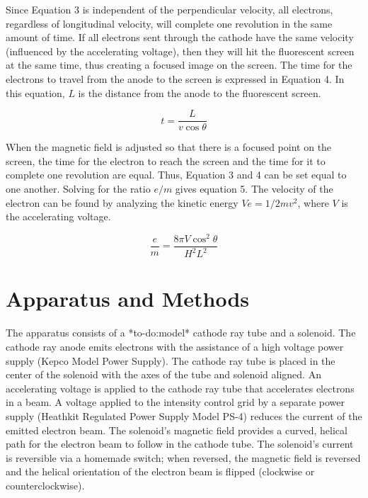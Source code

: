 \documentclass[%
 aip,
 amsmath,amssymb,
 reprint,%
floatfix,
]{revtex4-1}
\begin{document}
\noindent Since Equation 3 is independent of the perpendicular velocity, all electrons, regardless of longitudinal velocity, will complete one revolution in the same amount of time. If all electrons sent through the cathode have the same velocity (influenced by the accelerating voltage), then they will hit the fluorescent screen at the same time, thus creating a focused image on the screen. The time for the electrons to travel from the anode to the screen is expressed in Equation 4. In this equation, $L$ is the distance from the anode to the fluorescent screen.

\begin{equation}
	t = \frac{L}{v \cos{\theta}}
\end{equation}

\noindent When the magnetic field is adjusted so that there is a focused point on the screen, the time for the electron to reach the screen and the time for it to complete one revolution are equal. Thus, Equation 3 and 4 can be set equal to one another. Solving for the ratio $e/m$ gives equation 5. The velocity of the electron can be found by analyzing the kinetic energy $V e = 1/2 m v^2$, where $V$ is the accelerating voltage.

\begin{equation}
	\frac{e}{m} = \frac{8 \pi V \cos^2{\theta}}{H^2 L^2}
\end{equation}



\section{\label{sec:level3}Apparatus and Methods}

The apparatus consists of a *to-do:model* cathode ray tube and a solenoid. The cathode ray anode emits electrons with the assistance of a high voltage power supply (Kepco Model Power Supply). The cathode ray tube is placed in the center of the solenoid with the axes of the tube and solenoid aligned. An accelerating voltage is applied to the cathode ray tube that accelerates electrons in a beam. A voltage applied to the intensity control grid by a separate power supply (Heathkit Regulated Power Supply Model PS-4) reduces the current of the emitted electron beam. The solenoid's magnetic field provides a curved, helical path for the electron beam to follow in the cathode tube. The solenoid's current is reversible via a homemade switch; when reversed, the magnetic field is reversed and the helical orientation of the electron beam is flipped (clockwise or counterclockwise).
\end{document}
